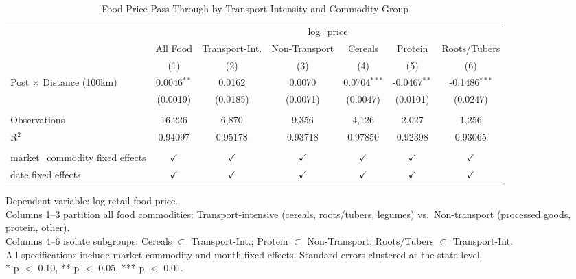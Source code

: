 
\begin{table}[htbp]
   \caption{\label{tab:food} Food Price Pass-Through by Transport Intensity and Commodity Group}
   \bigskip
   \centering
   \begin{adjustbox}{max width=\textwidth}
   \begin{tabular}{lcccccc}
      \toprule
       & \multicolumn{6}{c}{log\_price}\\
                                       & All Food      & Transport-Int. & Non-Transport & Cereals        & Protein        & Roots/Tubers \\   
                                       & (1)           & (2)            & (3)           & (4)            & (5)            & (6)\\  
      \midrule 
      Post $\times$ Distance (100km)   & 0.0046$^{**}$ & 0.0162         & 0.0070        & 0.0704$^{***}$ & -0.0467$^{**}$ & -0.1486$^{***}$\\   
                                       & (0.0019)      & (0.0185)       & (0.0071)      & (0.0047)       & (0.0101)       & (0.0247)\\   
       \\
      Observations                     & 16,226        & 6,870          & 9,356         & 4,126          & 2,027          & 1,256\\  
      R$^2$                            & 0.94097       & 0.95178        & 0.93718       & 0.97850        & 0.92398        & 0.93065\\  
       \\
      market\_commodity fixed effects  & $\checkmark$  & $\checkmark$   & $\checkmark$  & $\checkmark$   & $\checkmark$   & $\checkmark$\\   
      date fixed effects               & $\checkmark$  & $\checkmark$   & $\checkmark$  & $\checkmark$   & $\checkmark$   & $\checkmark$\\   
      \bottomrule
   \end{tabular}
   \end{adjustbox}
   
   \par \raggedright 
   Dependent variable: log retail food price.\\
   Columns 1--3 partition all food commodities: Transport-intensive (cereals, roots/tubers, legumes) vs.\ Non-transport (processed goods, protein, other).\\
   Columns 4--6 isolate subgroups: Cereals $\subset$ Transport-Int.; Protein $\subset$ Non-Transport; Roots/Tubers $\subset$ Transport-Int.\\
   All specifications include market-commodity and month fixed effects. Standard errors clustered at the state level.\\
   * p $<$ 0.10, ** p $<$ 0.05, *** p $<$ 0.01.
\end{table}


